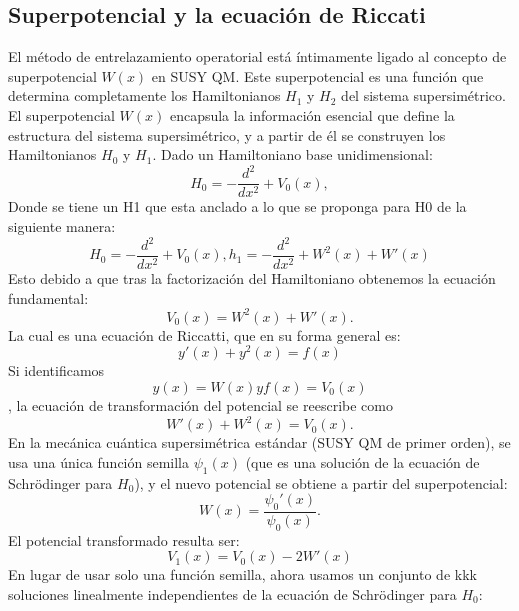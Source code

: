 \documentclass[%
 aip,
 jmp,%
 amsmath,amssymb,
 reprint,
]{revtex4-2}
\begin{document}
\subsection{Superpotencial y la ecuación de Riccati}
El método de entrelazamiento operatorial está íntimamente ligado al concepto de superpotencial \( W(x) \) en SUSY QM. Este superpotencial es una función que determina completamente los Hamiltonianos \( H_1 \) y \( H_2 \) del sistema supersimétrico. 
El superpotencial \( W(x) \) encapsula la información esencial que define la estructura del sistema supersimétrico, y a partir de él se construyen los Hamiltonianos \( H_0 \) y \( H_1 \).
Dado un Hamiltoniano base unidimensional:
\begin{equation}
H_0 = -\frac{d^2}{dx^2} + V_0(x),
\end{equation}
Donde se tiene un H1 que esta anclado a lo que se proponga para H0 de la siguiente manera:
\begin{equation}
H_0 = -\frac{d^2}{dx^2} + V_0(x),
h_1 = -\frac{d^2}{dx^2} + W^2(x) + W'(x)
\end{equation}
Esto debido a que tras la factorización del Hamiltoniano obtenemos la ecuación fundamental: 
\begin{equation}
V_0(x) = W^2(x) + W'(x).
\end{equation}
La cual es una ecuación de Riccatti, que en su forma general es: 
\begin{equation}
y'(x) + y^2(x) = f(x)
\end{equation}
Si identificamos
\begin{equation}
y(x) = W(x) y f(x) = V_0(x)
\end{equation}
, la ecuación de transformación del potencial se reescribe como
\begin{equation}
W'(x) + W^2(x) = V_0(x).
\end{equation}
En la mecánica cuántica supersimétrica estándar (SUSY QM de primer orden), se usa una única función semilla \( \psi_1(x) \) (que es una solución de la ecuación de Schrödinger para \( H_0 \)), y el nuevo potencial se obtiene a partir del superpotencial:
\begin{equation}
W(x) = \frac{\psi_0'(x)}{\psi_0(x)}.
\end{equation}
El potencial transformado resulta ser:
\begin{equation}
V_1(x) = V_0(x) - 2W'(x)
\end{equation}
En lugar de usar solo una función semilla, ahora usamos un conjunto de kkk soluciones linealmente independientes de la ecuación de Schrödinger para \( H_0 \):
\end{document}
